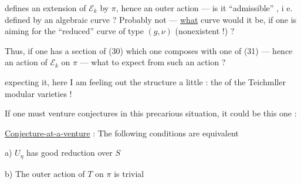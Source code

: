 defines an extension of $\mathcal E_k$ by $\pi$, hence an outer action --- is it ``admissible'' , i e. defined by an algebraic curve ? Probably not --- \uline{what} curve would it be, if one is aiming for the ``reduced'' curve of type $(g,\nu)$ (nonexistent !) ?

Thus, if one has a section of (30) which one composes with one of (31) --- hence an  action of $\mathcal E_k$ on $\pi$ --- what to expect from such an action ?

 expecting it, here I am feeling out the structure a little : the  of the Teichmller modular varieties !

If one must venture conjectures in this precarious situation, it could be this one :

\uline{Conjecture-at-a-venture} : The following conditions are equivalent

\noindent a) $U_\eta$ has good reduction over $S$

\noindent b) The outer action of $T$ on $\pi$ is trivial
